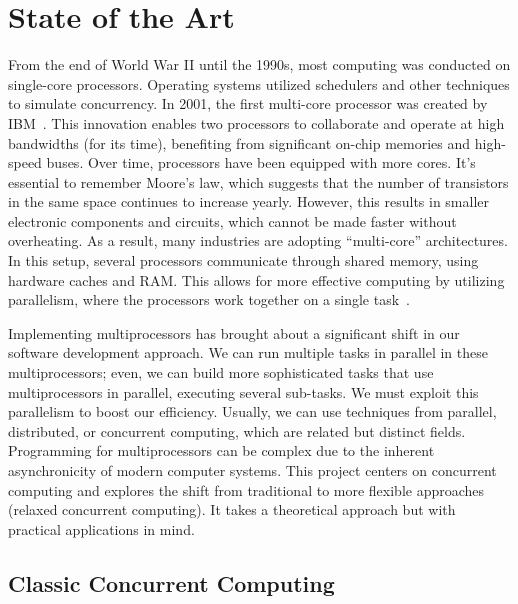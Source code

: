 \chapter{\label{chapter:2_State_of_art}State of the Art}

From the end of World War II until the 1990s, most computing was conducted on single-core processors. Operating systems utilized schedulers and other techniques to simulate concurrency. In 2001, the first multi-core processor was created by IBM~\cite{ibmIBM100Power}. This innovation enables two processors to collaborate and operate at high bandwidths (for its time), benefiting from significant on-chip memories and high-speed buses. Over time, processors have been equipped with more cores. It's essential to remember Moore's law, which suggests that the number of transistors in the same space continues to increase yearly. However, this results in smaller electronic components and circuits, which cannot be made faster without overheating. As a result, many industries are adopting ``multi-core'' architectures. In this setup, several processors communicate through shared memory, using hardware caches and RAM. This allows for more effective computing by utilizing parallelism, where the processors work together on a single task~\cite{DBLP_books_daglib_0020056}.

Implementing multiprocessors has brought about a significant shift in our software development approach. We can run multiple tasks in parallel in these multiprocessors; even, we can build more sophisticated tasks that use multiprocessors in parallel, executing several sub-tasks. We must exploit this parallelism to boost our efficiency. Usually, we can use techniques from parallel, distributed, or concurrent computing, which are related but distinct fields. Programming for multiprocessors can be complex due to the inherent asynchronicity of modern computer systems. This project centers on concurrent computing and explores the shift from traditional to more flexible approaches (relaxed concurrent computing). It takes a theoretical approach but with practical applications in mind.

\section{\label{section:classic-concurrent}Classic Concurrent Computing}

